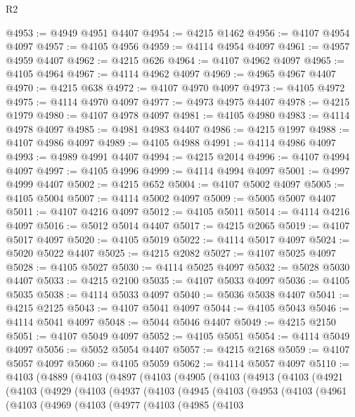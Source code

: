 \begin{lexlean}{R2}
\begin{coremodule}
@4953 := @4949 @4951 @4407
@4954 := @4215 @1462
@4956 := @4107 @4954 @4097
@4957 := @4105 @4956
@4959 := @4114 @4954 @4097
@4961 := @4957 @4959 @4407
@4962 := @4215 @626
@4964 := @4107 @4962 @4097
@4965 := @4105 @4964
@4967 := @4114 @4962 @4097
@4969 := @4965 @4967 @4407
@4970 := @4215 @638
@4972 := @4107 @4970 @4097
@4973 := @4105 @4972
@4975 := @4114 @4970 @4097
@4977 := @4973 @4975 @4407
@4978 := @4215 @1979
@4980 := @4107 @4978 @4097
@4981 := @4105 @4980
@4983 := @4114 @4978 @4097
@4985 := @4981 @4983 @4407
@4986 := @4215 @1997
@4988 := @4107 @4986 @4097
@4989 := @4105 @4988
@4991 := @4114 @4986 @4097
@4993 := @4989 @4991 @4407
@4994 := @4215 @2014
@4996 := @4107 @4994 @4097
@4997 := @4105 @4996
@4999 := @4114 @4994 @4097
@5001 := @4997 @4999 @4407
@5002 := @4215 @652
@5004 := @4107 @5002 @4097
@5005 := @4105 @5004
@5007 := @4114 @5002 @4097
@5009 := @5005 @5007 @4407
@5011 := @4107 @4216 @4097
@5012 := @4105 @5011
@5014 := @4114 @4216 @4097
@5016 := @5012 @5014 @4407
@5017 := @4215 @2065
@5019 := @4107 @5017 @4097
@5020 := @4105 @5019
@5022 := @4114 @5017 @4097
@5024 := @5020 @5022 @4407
@5025 := @4215 @2082
@5027 := @4107 @5025 @4097
@5028 := @4105 @5027
@5030 := @4114 @5025 @4097
@5032 := @5028 @5030 @4407
@5033 := @4215 @2100
@5035 := @4107 @5033 @4097
@5036 := @4105 @5035
@5038 := @4114 @5033 @4097
@5040 := @5036 @5038 @4407
@5041 := @4215 @2125
@5043 := @4107 @5041 @4097
@5044 := @4105 @5043
@5046 := @4114 @5041 @4097
@5048 := @5044 @5046 @4407
@5049 := @4215 @2150
@5051 := @4107 @5049 @4097
@5052 := @4105 @5051
@5054 := @4114 @5049 @4097
@5056 := @5052 @5054 @4407
@5057 := @4215 @2168
@5059 := @4107 @5057 @4097
@5060 := @4105 @5059
@5062 := @4114 @5057 @4097
@5110 := @4103
    (@4889
      (@4103
        (@4897
          (@4103
            (@4905
              (@4103
                (@4913
                  (@4103
                    (@4921
                      (@4103
                        (@4929
                          (@4103
                            (@4937
                              (@4103
                                (@4945
                                  (@4103
                                    (@4953
                                      (@4103
                                        (@4961
                                          (@4103
                                            (@4969
                                              (@4103
                                                (@4977
                                                  (@4103
                                                    (@4985
                                                      (@4103

\end{coremodule}
\end{lexlean}
